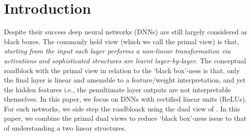 \section{Introduction}\label{sec:intro}
Despite their success deep neural networks (DNNs) are still largely considered as black boxes. The commonly held view (which we call the primal view) is that, \emph{starting from the input each layer performs a non-linear transformation via activations and sophisticated structures are learnt layer-by-layer}. The conceptual roadblock with the primal view in relation to the `black box'-ness is that, only the final layer is linear and amenable to a feature/weight interpretation, and yet the hidden features i.e., the penultimate layer outputs are not interpretable themselves. In this paper, we focus on DNNs with rectified linear units (ReLUs). For such networks, we side step the roadbloack using the dual view of \cite{npk}. In this paper, we combine the primal dual views to reduce `black box'-ness issue to that of understanding a two linear structures.



